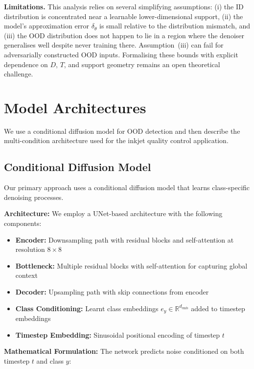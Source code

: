 \textbf{Limitations.} This analysis relies on several simplifying assumptions: (i) the ID distribution is concentrated near a learnable lower-dimensional support, (ii) the model's approximation error $\delta_\theta$ is small relative to the distribution mismatch, and (iii) the OOD distribution does not happen to lie in a region where the denoiser generalises well despite never training there. Assumption~(iii) can fail for adversarially constructed OOD inputs. Formalising these bounds with explicit dependence on $D$, $T$, and support geometry remains an open theoretical challenge.


\section{Model Architectures}
\label{sec:meth:architectures}

We use a conditional diffusion model for OOD detection and then describe the multi-condition architecture used for the inkjet quality control application.

\subsection{Conditional Diffusion Model}
\label{sec:meth:architectures:cdm}

Our primary approach uses a conditional diffusion model that learns class-specific denoising processes.

\textbf{Architecture:} We employ a UNet-based architecture with the following components:
\begin{itemize}
    \item \textbf{Encoder:} Downsampling path with residual blocks and self-attention at resolution $8 \times 8$
    \item \textbf{Bottleneck:} Multiple residual blocks with self-attention for capturing global context
    \item \textbf{Decoder:} Upsampling path with skip connections from encoder
    \item \textbf{Class Conditioning:} Learnt class embeddings $e_y \in \mathbb{R}^{d_{\text{emb}}}$ added to timestep embeddings
    \item \textbf{Timestep Embedding:} Sinusoidal positional encoding of timestep $t$
\end{itemize}

\textbf{Mathematical Formulation:} The network predicts noise conditioned on both timestep $t$ and class $y$:

